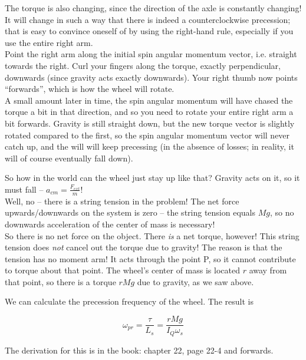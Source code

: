 The torque is also changing, since the direction of the axle is constantly changing! It will change in such a way that there is indeed a counterclockwise precession; that is easy to convince oneself of by using the right-hand rule, especially if you use the entire right arm.\\
Point the right arm along the initial spin angular momentum vector, i.e. straight towards the right. Curl your fingers along the torque, exactly perpendicular, downwards (since gravity acts exactly downwards). Your right thumb now points ``forwards'', which is how the wheel will rotate.\\
A small amount later in time, the spin angular momentum will have chased the torque a bit in that direction, and so you need to rotate your entire right arm a bit forwards. Gravity is still straight down, but the new torque vector is slightly rotated compared to the first, so the spin angular momentum vector will never catch up, and the will will keep precessing (in the absence of losses; in reality, it will of course eventually fall down).

So how in the world can the wheel just stay up like that? Gravity acts on it, so it must fall -- $\displaystyle a_{cm} = \frac{F_{ext}}{m}$!\\
Well, no -- there is a string tension in the problem! The net force upwards/downwards on the system is zero -- the string tension equals $M g$, so no downwards acceleration of the center of mass is necessary!\\
So there is no net force on the object. There \emph{is} a net torque, however! This string tension does \emph{not} cancel out the torque due to gravity! The reason is that the tension has no moment arm! It acts through the point P, so it cannot contribute to torque about that point. The wheel's center of mass is located $r$ away from that point, so there is a torque $r M g$ due to gravity, as we saw above.

We can calculate the precession frequency of the wheel. The result is

\begin{equation}
\omega_{pr} = \frac{\tau}{L_s} = \frac{r M g}{I_Q \omega_s}
\end{equation}

The derivation for this is in the book: chapter 22, page 22-4 and forwards.

